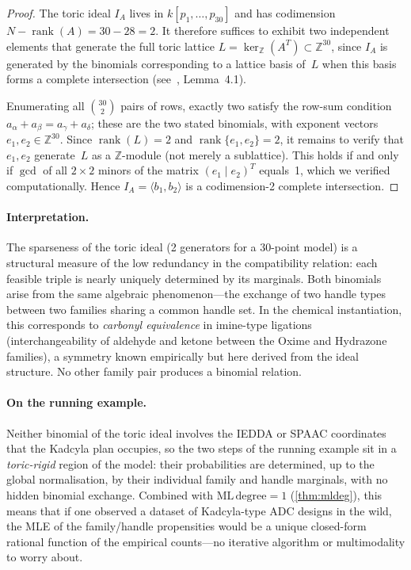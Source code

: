 \documentclass[preprint,12pt]{elsarticle}
\theoremstyle{definition}
\theoremstyle{remark}
\newcommand{\kk}{k}
\newcommand{\ZZ}{\mathbb{Z}}
\DeclareMathOperator{\rank}{rank}
\begin{document}
\begin{proof}
The toric ideal $I_A$ lives in $\kk[p_1, \ldots, p_{30}]$ and
has codimension $N - \rank(A) = 30 - 28 = 2$.  It therefore
suffices to exhibit two independent elements that generate
the full toric lattice $L = \ker_{\ZZ}(A^T) \subset \ZZ^{30}$,
since $I_A$ is generated by the binomials corresponding to a
lattice basis of~$L$ when this basis forms a complete intersection
(see~\cite{Sturmfels96}, Lemma~4.1).

Enumerating all $\binom{30}{2}$ pairs of rows, exactly two
satisfy the row-sum condition
$a_\alpha + a_\beta = a_\gamma + a_\delta$;
these are the two stated binomials, with exponent vectors
$e_1, e_2 \in \ZZ^{30}$.  Since $\rank(L) = 2$ and
$\rank\{e_1, e_2\} = 2$, it remains to verify that $e_1, e_2$
generate~$L$ as a $\ZZ$-module (not merely a sublattice).  This
holds if and only if $\gcd$ of all $2 \times 2$ minors of the
matrix $(e_1 \mid e_2)^T$ equals~1, which we verified
computationally.  Hence $I_A = \langle b_1, b_2 \rangle$ is a
codimension-2 complete intersection.
\end{proof}

\paragraph{Interpretation.}
The sparseness of the toric ideal (2 generators for a 30-point
model) is a structural measure of the low redundancy in the
compatibility relation: each feasible triple is nearly uniquely
determined by its marginals.  Both binomials arise from the same
algebraic phenomenon---the exchange of two handle types between
two families sharing a common handle set.  In the chemical
instantiation, this corresponds to \emph{carbonyl equivalence}
in imine-type ligations (interchangeability of aldehyde and
ketone between the Oxime and Hydrazone families), a symmetry
known empirically but here derived from the ideal structure.
No other family pair produces a binomial relation.

\paragraph{On the running example.}
Neither binomial of the toric ideal involves the IEDDA or SPAAC
coordinates that the Kadcyla plan occupies, so the two steps of
the running example sit in a \emph{toric-rigid} region of the
model: their probabilities are determined, up to the global
normalisation, by their individual family and handle marginals,
with no hidden binomial exchange.  Combined with $\mathrm{ML\,degree} = 1$
(\cref{thm:mldeg}), this means that if one observed a dataset of
Kadcyla-type ADC designs in the wild, the MLE of the
family/handle propensities would be a unique closed-form rational
function of the empirical counts---no iterative algorithm or
multimodality to worry about.
\end{document}
